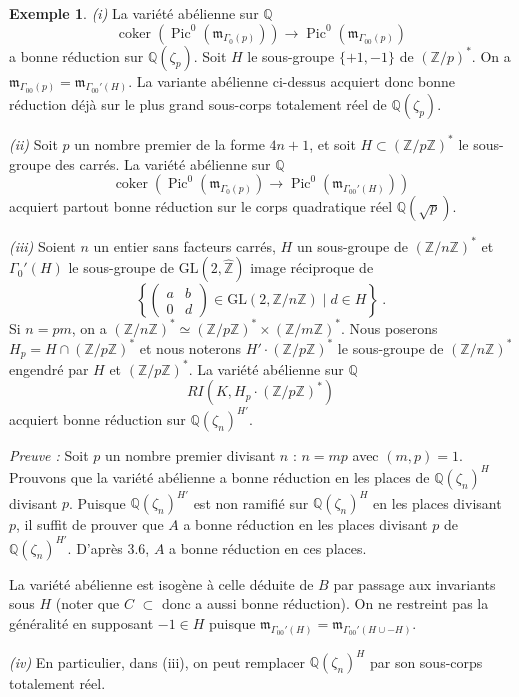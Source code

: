 \documentclass[10pt,a4paper]{amsart}
\theoremstyle{plain}
\theoremstyle{definition}
\newtheorem{example}[theorem]{Exemple}
\DeclareMathOperator{\Pic}{Pic}
\DeclareMathOperator{\coker}{coker}
\newcommand{\m}{\mathfrak{m}}
\newcommand{\ZZ}{\mathbb{Z}}
\newcommand{\QQ}{\mathbb{Q}}
\newcommand{\GL}{\mathrm{GL}}
\begin{document}
\begin{example}
\emph{(i)} La vari\'et\'e ab\'elienne sur $\QQ$
\[
\coker(\Pic^0(\m_{\Gamma_0(p)})) \to \Pic^0(\m_{\Gamma_{00}(p)})
\]
a bonne r\'eduction sur $\QQ(\zeta_p)$. Soit $H$ le sous-groupe $\{+1,-1\}$ de $(\ZZ/p)^*$. On a $\m_{\Gamma_{00}(p)} = \m_{\Gamma_{00}'(H)}$. La variante ab\'elienne ci-dessus acquiert donc bonne r\'eduction d\'ej\`a sur le plus grand sous-corps totalement r\'eel de $\QQ(\zeta_p)$.

\emph{(ii)} Soit $p$ un nombre premier de la forme $4n+1$, et soit $H \subset (\ZZ/p\ZZ)^*$ le sous-groupe des carr\'es. La vari\'et\'e ab\'elienne sur $\QQ$
\[
\coker(\Pic^0(\m_{\Gamma_0(p)}) \to \Pic^0(\m_{\Gamma_{00}'(H)}))
\]
acquiert partout bonne r\'eduction sur le corps quadratique r\'eel $\QQ(\sqrt{p})$.

\emph{(iii)} Soient $n$ un entier sans facteurs carr\'es, $H$ un sous-groupe de $(\ZZ/n\ZZ)^*$ et $\Gamma_0'(H)$ le sous-groupe de $\GL(2,\hat{\ZZ})$ image r\'eciproque de
\[
\left\{\begin{pmatrix} a & b \\ 0 & d \end{pmatrix} \in \GL(2,\ZZ/n\ZZ) \mid d \in H\right\}\ .
\]
Si $n = pm$, on a $(\ZZ/n\ZZ)^* \simeq (\ZZ/p\ZZ)^* \times (\ZZ/m\ZZ)^*$. Nous poserons $H_p = H \cap (\ZZ/p\ZZ)^*$ et nous noterons $H' \cdot (\ZZ/p\ZZ)^*$ le sous-groupe de $(\ZZ/n\ZZ)^*$ engendr\'e par $H$ et $(\ZZ/p\ZZ)^*$. La vari\'et\'e ab\'elienne sur $\QQ$
\[
RI(K, H_p \cdot (\ZZ/p\ZZ)^*)
\]
acquiert bonne r\'eduction sur $\QQ(\zeta_n)^{H'}$.

\emph{Preuve :} Soit $p$ un nombre premier divisant $n$ : $n = mp$ avec $(m,p) = 1$. Prouvons que la vari\'et\'e ab\'elienne a bonne r\'eduction en les places de $\QQ(\zeta_n)^H$ divisant $p$. Puisque $\QQ(\zeta_n)^{H'}$ est non ramifi\'e sur $\QQ(\zeta_n)^H$ en les places divisant $p$, il suffit de prouver que $A$ a bonne r\'eduction en les places divisant $p$ de $\QQ(\zeta_n)^{H'}$. D'apr\`es 3.6, $A$ a bonne r\'eduction en ces places.

La vari\'et\'e ab\'elienne est isog\`ene \`a celle d\'eduite de $B$ par passage aux invariants sous $H$ (noter que $C$ $\subset$ donc a aussi bonne r\'eduction). On ne restreint pas la g\'en\'eralit\'e en supposant $-1 \in H$ puisque $\m_{\Gamma_{00}'(H)} = \m_{\Gamma_{00}'(H \cup -H)}$.

\emph{(iv)} En particulier, dans (iii), on peut remplacer $\QQ(\zeta_n)^H$ par son sous-corps totalement r\'eel.
\end{example}
\end{document}
